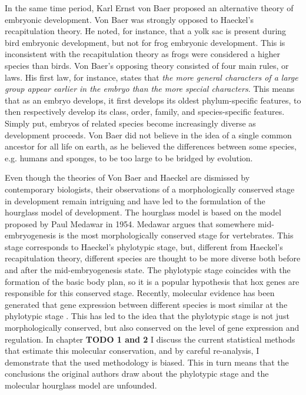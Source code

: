In the same time period, Karl Ernst von Baer proposed an alternative theory of embryonic development. Von Baer was strongly opposed to Haeckel's recapitulation theory. He noted, for instance, that a yolk sac is present during bird embryonic development, but not for frog embryonic development. This is inconsistent with the recapitulation theory as frogs were considered a higher species than birds. Von Baer's opposing theory consisted of four main rules, or laws\cite{baer1828}. His first law, for instance, states that \textit{the more general characters of a large group appear earlier in the embryo than the more special characters}. This means that as an embryo develops, it first develops its oldest phylum-specific features, to then respectively develop its class, order, family, and species-specific features. Simply put, embryos of related species become increasingly diverse as development proceeds. Von Baer did not believe in the idea of a single common ancestor for all life on earth, as he believed the differences between some species, e.g. humans and sponges, to be too large to be bridged by evolution.

Even though the theories of Von Baer and Haeckel are dismissed by contemporary biologists, their observations of a morphologically conserved stage in development remain intriguing and have led to the formulation of the hourglass model of development. The hourglass model is based on the model proposed by Paul Medawar in 1954\cite{Medawar1954}. Medawar argues that somewhere mid-embryogenesis is the most morphologically conserved stage for vertebrates. This stage corresponds to Haeckel's phylotypic stage, but, different from Haeckel's recapitulation theory, different species are thought to be more diverse both before and after the mid-embryogenesis state. The phylotypic stage coincides with the formation of the basic body plan, so it is a popular hypothesis that hox genes are responsible for this conserved stage. Recently, molecular evidence has been generated that gene expression between different species is most similar at the phylotypic stage \cite{Levin2016,marletaz2018,Mayshar2023,Liu2021,DomazetLoso2010,Irie2011,Kalinka2010,Piasecka2013,Uesaka2019}. This has led to the idea that the phylotypic stage is not just morphologically conserved, but also conserved on the level of gene expression and regulation. In chapter \textbf{TODO 1 and 2} I discuss the current statistical methods that estimate this molecular conservation, and by careful re-analysis, I demonstrate that the used methodology is biased. This in turn means that the conclusions the original authors draw about the phylotypic stage and the molecular hourglass model are unfounded. 

